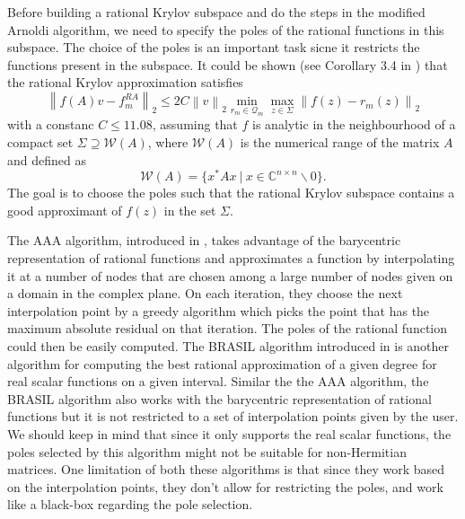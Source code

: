 Before building a rational Krylov subspace and do the steps in the modified Arnoldi
algorithm, we need to specify the poles of the rational functions in this subspace.
The choice of the poles is an important task sicne it restricts the functions present
in the subspace. It could be shown (see Corollary 3.4 in \cite{guttel2013rational}) that
the rational Krylov approximation satisfies
\begin{equation*}
    \left\| f(A)v - f_m^{RA}  \right\|_2 \le 2 C \left\| v \right\|_2
    \min_{r_m \in \mathcal{Q}_{m}} \max_{z \in \Sigma} \left\| f(z) - r_m(z) \right\|_2
\end{equation*}
with a constanc $C \le 11.08$, assuming that $f$ is analytic in the neighbourhood of
a compact set $\Sigma \supseteq \mathcal{W}(A)$, where $\mathcal{W}(A)$ is the numerical range
of the matrix $A$ and defined as
\begin{equation}
    \label{eq:numericalrange}
    \mathcal{W}(A) = \{x^* A x \:|\: x \in \mathbb{C}^{n \times n} \backslash {0} \}.
\end{equation}
The goal is to choose the poles such that the rational Krylov subspace contains a good approximant
of $f(z)$ in the set $\Sigma$.

The AAA algorithm, introduced in \cite{nakatsukasa2018AAA}, takes advantage of the barycentric
representation of rational functions and approximates a function by interpolating it at a number
of nodes that are chosen among a large number of nodes given on a domain in the complex plane.
On each iteration, they choose the next interpolation point by a greedy algorithm which picks
the point that has the maximum absolute residual on that iteration. The poles of the rational
function could then be easily computed.
The BRASIL algorithm introduced in \cite{hofreither2021BRASIL} is another algorithm for
computing the best rational approximation of a given degree for real scalar functions on a
given interval.
Similar the the AAA algorithm, the BRASIL algorithm also works with the barycentric
representation of rational functions but it is not restricted to a set of interpolation
points given by the user. We should keep in mind that since it only supports the real scalar
functions, the poles selected by this algorithm might not be suitable for non-Hermitian matrices.
One limitation of both these algorithms is that since they work based on the interpolation points,
they don't allow for restricting the poles, and work like a black-box regarding the pole selection.

